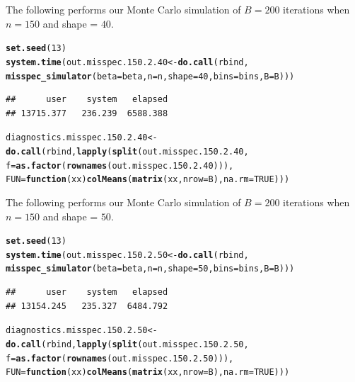 \documentclass[11pt]{article}\usepackage[]{graphicx}\usepackage[]{color}
\makeatletter
\newcommand{\hlnum}[1]{\textcolor[rgb]{0.686,0.059,0.569}{#1}}%
\newcommand{\hlstd}[1]{\textcolor[rgb]{0.345,0.345,0.345}{#1}}%
\newcommand{\hlkwa}[1]{\textcolor[rgb]{0.161,0.373,0.58}{\textbf{#1}}}%
\newcommand{\hlkwb}[1]{\textcolor[rgb]{0.69,0.353,0.396}{#1}}%
\newcommand{\hlkwc}[1]{\textcolor[rgb]{0.333,0.667,0.333}{#1}}%
\newcommand{\hlkwd}[1]{\textcolor[rgb]{0.737,0.353,0.396}{\textbf{#1}}}%
\newenvironment{kframe}{%
 \def\at@end@of@kframe{}%
 \ifinner\ifhmode%
  \def\at@end@of@kframe{\end{minipage}}%
  \begin{minipage}{\columnwidth}%
 \fi\fi%
 \def\FrameCommand##1{\hskip\@totalleftmargin \hskip-\fboxsep
 \colorbox{shadecolor}{##1}\hskip-\fboxsep
     \hskip-\linewidth \hskip-\@totalleftmargin \hskip\columnwidth}%
 \MakeFramed {\advance\hsize-\width
   \@totalleftmargin\z@ \linewidth\hsize
   \@setminipage}}%
 {\par\unskip\endMakeFramed%
 \at@end@of@kframe}
\newenvironment{knitrout}{}{} %
\makeatother
\begin{document}
The following performs our Monte Carlo simulation of $B = 200$ iterations 
when $n = 150$ and shape = $40$.

\begin{knitrout}
\color{fgcolor}\begin{kframe}
\begin{alltt}
\hlkwd{set.seed}\hlstd{(}\hlnum{13}\hlstd{)}
\hlkwd{system.time}\hlstd{(out.misspec.150.2.40} \hlkwb{<-} \hlkwd{do.call}\hlstd{(rbind,}
  \hlkwd{misspec_simulator}\hlstd{(}\hlkwc{beta} \hlstd{= beta,} \hlkwc{n} \hlstd{= n,} \hlkwc{shape} \hlstd{=} \hlnum{40}\hlstd{,} \hlkwc{bins} \hlstd{= bins,} \hlkwc{B} \hlstd{= B)))}
\end{alltt}
\begin{verbatim}
##      user    system   elapsed 
## 13715.377   236.239  6588.388
\end{verbatim}
\begin{alltt}
\hlstd{diagnostics.misspec.150.2.40} \hlkwb{<-} \hlkwd{do.call}\hlstd{(rbind,} \hlkwd{lapply}\hlstd{(}\hlkwd{split}\hlstd{(out.misspec.150.2.40,}
  \hlkwc{f} \hlstd{=} \hlkwd{as.factor}\hlstd{(}\hlkwd{rownames}\hlstd{(out.misspec.150.2.40))),}
  \hlkwc{FUN} \hlstd{=} \hlkwa{function}\hlstd{(}\hlkwc{xx}\hlstd{)} \hlkwd{colMeans}\hlstd{(}\hlkwd{matrix}\hlstd{(xx,} \hlkwc{nrow} \hlstd{= B),} \hlkwc{na.rm} \hlstd{=} \hlnum{TRUE}\hlstd{)))}
\end{alltt}
\end{kframe}
\end{knitrout}


The following performs our Monte Carlo simulation of $B = 200$ iterations 
when $n = 150$ and shape = $50$.

\begin{knitrout}
\color{fgcolor}\begin{kframe}
\begin{alltt}
\hlkwd{set.seed}\hlstd{(}\hlnum{13}\hlstd{)}
\hlkwd{system.time}\hlstd{(out.misspec.150.2.50} \hlkwb{<-} \hlkwd{do.call}\hlstd{(rbind,}
  \hlkwd{misspec_simulator}\hlstd{(}\hlkwc{beta} \hlstd{= beta,} \hlkwc{n} \hlstd{= n,} \hlkwc{shape} \hlstd{=} \hlnum{50}\hlstd{,} \hlkwc{bins} \hlstd{= bins,} \hlkwc{B} \hlstd{= B)))}
\end{alltt}
\begin{verbatim}
##      user    system   elapsed 
## 13154.245   235.327  6484.792
\end{verbatim}
\begin{alltt}
\hlstd{diagnostics.misspec.150.2.50} \hlkwb{<-} \hlkwd{do.call}\hlstd{(rbind,} \hlkwd{lapply}\hlstd{(}\hlkwd{split}\hlstd{(out.misspec.150.2.50,}
  \hlkwc{f} \hlstd{=} \hlkwd{as.factor}\hlstd{(}\hlkwd{rownames}\hlstd{(out.misspec.150.2.50))),}
  \hlkwc{FUN} \hlstd{=} \hlkwa{function}\hlstd{(}\hlkwc{xx}\hlstd{)} \hlkwd{colMeans}\hlstd{(}\hlkwd{matrix}\hlstd{(xx,} \hlkwc{nrow} \hlstd{= B),} \hlkwc{na.rm} \hlstd{=} \hlnum{TRUE}\hlstd{)))}
\end{alltt}
\end{kframe}
\end{knitrout}
\end{document}
